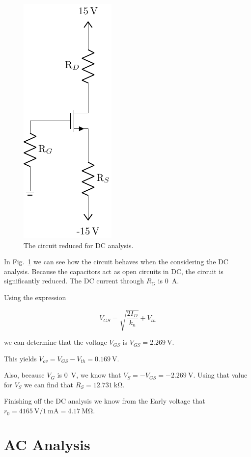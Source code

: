 \documentclass{../../ece-report}
\begin{document}
\begin{figure}[h!]
  \centering
  \includegraphics{../circuits/circuit_dc.pdf}
  \caption{The circuit reduced for DC analysis.}\label{fig:circuit_dc}
\end{figure}

In Fig.~\ref{fig:circuit_dc} we can see how the circuit
behaves when the considering the DC analysis. Because
the capacitors act as open circuits in DC, the circuit
is significantly reduced. The DC current through $R_G$ is 0~A.

Using the expression

\[
  V_{GS} = \sqrt{ \frac{2 I_D}{k_n}} + V_{th}
\]

we can determine that the voltage $V_{GS}$ is $V_{GS}= 2.269~\si{\V}$.

This yields $V_{ov}= V_{GS} - V_{th} = 0.169~\si{\V}$.

Also, because $V_G$ is 0~V, we know that $V_S = -V_{GS}
= -2.269~\si{\V}$. Using that value for $V_S$ we can find that $R_S = 12.731~\si{\kohm}$.

Finishing off the DC analysis we know from the Early voltage that
$r_0 = 4165~\si{\V} / 1~\si{\mA} = 4.17~\si{\Mohm}$.

\section{AC Analysis}
\end{document}
